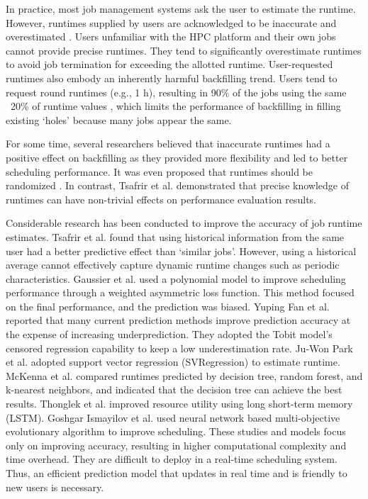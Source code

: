 \documentclass[a4paper,fleqn]{cas-sc}
\begin{document}
In practice, most job management systems ask the user to estimate the runtime. However, runtimes supplied by users are acknowledged to be inaccurate and overestimated \cite{11JSSPP}. Users unfamiliar with the HPC platform and their own jobs cannot provide precise runtimes. They tend to significantly overestimate runtimes to avoid job termination for exceeding the allotted runtime. User-requested runtimes also embody an inherently harmful backfilling trend. Users tend to request round runtimes (e.g., 1 h), resulting in 90\% of the jobs using the same ~20\% of runtime values \cite{6Tsafrir}, which limits the performance of backfilling in filling existing `holes' because many jobs appear the same.

For some time, several researchers believed that inaccurate runtimes had a positive effect on backfilling as they provided more flexibility and led to better scheduling performance. It was even proposed that runtimes should be randomized \cite{16Random}. In contrast, Tsafrir et al. \cite{6Tsafrir} demonstrated that precise knowledge of runtimes can have non-trivial effects on performance evaluation results. 

Considerable research has been conducted to improve the accuracy of job runtime estimates. Tsafrir et al.\citep{6Tsafrir} found that using historical information from the same user had a better predictive effect than ‘similar jobs’. However, using a historical average cannot effectively capture dynamic runtime changes such as periodic characteristics. Gaussier et al. \cite{2SC15} used a polynomial model to improve scheduling performance through a weighted asymmetric loss function. This method focused on the final performance, and the prediction was biased. Yuping Fan et al. \cite{3Cluster17} reported that many current prediction methods improve prediction accuracy at the expense of increasing underprediction. They adopted the Tobit model's censored regression capability to  keep a low underestimation rate. Ju-Won Park et al. \cite{9JSC} adopted support vector regression (SVRegression) to estimate runtime. McKenna et al. \cite{17Cluster16} compared runtimes predicted by decision tree, random forest, and k-nearest neighbors, and indicated that the decision tree can achieve the best results. Thonglek et al. \cite{18Cluster19} improved resource utility using long short-term memory (LSTM). Goshgar Ismayilov et al. \cite{24FGCS} used neural network based multi-objective evolutionary algorithm to improve scheduling. These studies and models focus only on improving accuracy, resulting in higher computational complexity and time overhead. They are difficult to deploy in a real-time scheduling system. Thus, an efficient prediction model that updates in real time and is friendly to new users is necessary.
\end{document}
